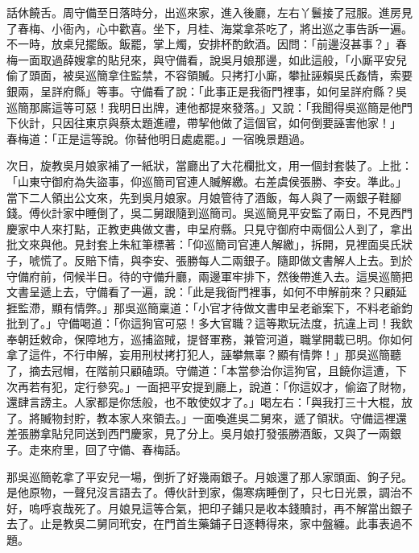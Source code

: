 話休饒舌。周守備至日落時分，出巡來家，進入後廳，左右丫鬟接了冠服。進房見了春梅、小衙內，心中歡喜。坐下，月桂、海棠拿茶吃了，將出巡之事告訴一遍。不一時，放桌兒擺飯。飯罷，掌上燭，安排杯酌飲酒。因問：「前邊沒甚事？」春梅一面取過薛嫂拿的貼兒來，與守備看，說吳月娘那邊，如此這般，「小廝平安兒偷了頭面，被吳巡簡拿住監禁，不容領贓。只拷打小廝，攀扯誣賴吳氏姦情，索要銀兩，呈詳府縣」等事。守備看了說：「此事正是我衙門裡事，如何呈詳府縣？吳巡簡那廝這等可惡！我明日出牌，連他都提來發落。」又說：「我聞得吳巡簡是他門下伙計，只因往東京與蔡太題進禮，帶挈他做了這個官，如何倒要誣害他家！」 春梅道：「正是這等說。你替他明日處處罷。」一宿晚景題過。

次日，旋教吳月娘家補了一紙狀，當廳出了大花欄批文，用一個封套裝了。上批：「山東守御府為失盜事，仰巡簡司官連人贓解繳。右差虞侯張勝、李安。準此。」 當下二人領出公文來，先到吳月娘家。月娘管待了酒飯，每人與了一兩銀子鞋腳錢。傅伙計家中睡倒了，吳二舅跟隨到巡簡司。吳巡簡見平安監了兩日，不見西門慶家中人來打點，正教吏典做文書，申呈府縣。只見守御府中兩個公人到了，拿出批文來與他。見封套上朱紅筆標著：「仰巡簡司官連人解繳」，拆開，見裡面吳氏狀子，唬慌了。反賠下情，與李安、張勝每人二兩銀子。隨即做文書解人上去。到於守備府前，伺候半日。待的守備升廳，兩邊軍牢排下，然後帶進入去。這吳巡簡把文書呈遞上去，守備看了一遍，說：「此是我衙門裡事，如何不申解前來？只顧延捱監滯，顯有情弊。」那吳巡簡稟道：「小官才待做文書申呈老爺案下，不料老爺鈞批到了。」守備喝道：「你這狗官可惡！多大官職？這等欺玩法度，抗違上司！我欽奉朝廷敕命，保障地方，巡捕盜賊，提督軍務，兼管河道，職掌開載已明。你如何拿了這件，不行申解，妄用刑杖拷打犯人，誣攀無辜？顯有情弊！」那吳巡簡聽了，摘去冠帽，在階前只顧磕頭。守備道：「本當參治你這狗官，且饒你這遭，下次再若有犯，定行參究。」一面把平安提到廳上，說道：「你這奴才，偷盜了財物，還肆言謗主。人家都是你恁般，也不敢使奴才了。」喝左右：「與我打三十大棍，放了。將贓物封貯，教本家人來領去。」一面喚進吳二舅來，遞了領狀。守備這裡還差張勝拿貼兒同送到西門慶家，見了分上。吳月娘打發張勝酒飯，又與了一兩銀子。走來府里，回了守備、春梅話。

那吳巡簡乾拿了平安兒一場，倒折了好幾兩銀子。月娘還了那人家頭面、鉤子兒。是他原物，一聲兒沒言語去了。傅伙計到家，傷寒病睡倒了，只七日光景，調治不好，嗚呼哀哉死了。月娘見這等合氣，把印子鋪只是收本錢贖討，再不解當出銀子去了。止是教吳二舅同玳安，在門首生藥鋪子日逐轉得來，家中盤纏。此事表過不題。

